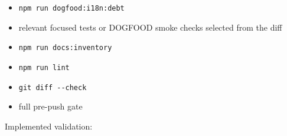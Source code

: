 \begin{itemize}
\item
  \texttt{n\allowbreak{}p\allowbreak{}m\allowbreak{} \allowbreak{}r\allowbreak{}u\allowbreak{}n\allowbreak{} \allowbreak{}d\allowbreak{}o\allowbreak{}g\allowbreak{}f\allowbreak{}o\allowbreak{}o\allowbreak{}d\allowbreak{}:\allowbreak{}i\allowbreak{}1\allowbreak{}8\allowbreak{}n\allowbreak{}:\allowbreak{}d\allowbreak{}e\allowbreak{}b\allowbreak{}t}
\item
  relevant focused tests or DOGFOOD smoke checks selected from the diff
\item
  \texttt{n\allowbreak{}p\allowbreak{}m\allowbreak{} \allowbreak{}r\allowbreak{}u\allowbreak{}n\allowbreak{} \allowbreak{}d\allowbreak{}o\allowbreak{}c\allowbreak{}s\allowbreak{}:\allowbreak{}i\allowbreak{}n\allowbreak{}v\allowbreak{}e\allowbreak{}n\allowbreak{}t\allowbreak{}o\allowbreak{}r\allowbreak{}y}
\item
  \texttt{n\allowbreak{}p\allowbreak{}m\allowbreak{} \allowbreak{}r\allowbreak{}u\allowbreak{}n\allowbreak{} \allowbreak{}l\allowbreak{}i\allowbreak{}n\allowbreak{}t}
\item
  \texttt{g\allowbreak{}i\allowbreak{}t\allowbreak{} \allowbreak{}d\allowbreak{}i\allowbreak{}f\allowbreak{}f\allowbreak{} \allowbreak{}-\allowbreak{}-\allowbreak{}c\allowbreak{}h\allowbreak{}e\allowbreak{}c\allowbreak{}k}
\item
  full pre-push gate
\end{itemize}

Implemented validation:

